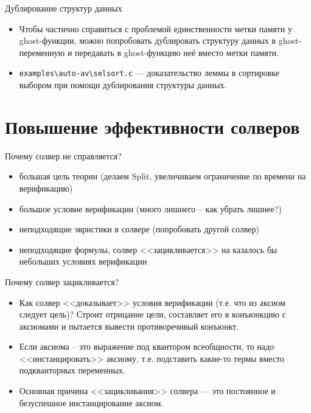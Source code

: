 \documentclass[hyperref={unicode=true}]{beamer}
\begin{document}
    \begin{frame}{Дублирование структур данных}
    \begin{itemize}
    \item Чтобы частично справиться с проблемой единственности метки памяти у ghost-функции, можно попробовать
    дублировать структуру данных в ghost-переменную и передавать в ghost-функцию неё вместо метки памяти.
    \item \texttt{examples\textbackslash auto-av\textbackslash selsort.c} --- доказательство леммы в
    сортировке выбором при помощи дублирования структуры данных.
    \end{itemize}
    \end{frame}

    \section{Повышение эффективности солверов}

    \begin{frame}{Почему солвер не справляется?}
    \begin{itemize}
    \item большая цель теории (делаем Split, увеличиваем ограничение по времени на верификацию)
    \item большое условие верификации (много лишнего -- как убрать лишнее?)
    \item неподходящие эвристики в солвере (попробовать другой солвер)
    \item неподходящие формулы, солвер <<зацикливается>> на казалось бы небольших условиях верификации
    \end{itemize}
    \end{frame}

    \begin{frame}{Почему солвер зацикливается?}
    \begin{itemize}
    \item Как солвер <<доказывает>> условия верификации (т.е. что из аксиом следует цель)? Строит отрицание
    цели, составляет его в конъюнкцию с аксиомами и пытается вывести противоречивый конъюнкт.
    \item Если аксиома -- это выражение под квантором всеобщности, то надо <<инстанцировать>> аксиому,
    т.е. подставить какие-то термы вместо подкванторных переменных.
    \item Основная причина <<зацикливания>> солвера --- это постоянное и безуспешное инстанцирование аксиом.
    \end{itemize}
    \end{frame}
\end{document}

